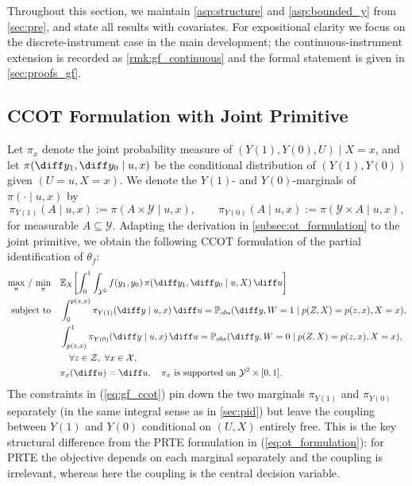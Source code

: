 Throughout this section, we maintain \cref{asp:structure} and \cref{asp:bounded_y} from \cref{sec:pre}, and state all results with covariates. For expositional clarity we focus on the discrete-instrument case in the main development; the continuous-instrument extension is recorded as \cref{rmk:gf_continuous} and the formal statement is given in \cref{sec:proofs_gf}.

\subsection{CCOT Formulation with Joint Primitive}\label{subsec:gf_setup}

Let $\pi_x$ denote the joint probability measure of $(Y(1), Y(0), U) \mid X = x$, and let $\pi(\diff y_1, \diff y_0 \mid u, x)$ be the conditional distribution of $(Y(1), Y(0))$ given $(U = u, X = x)$. We denote the $Y(1)$- and $Y(0)$-marginals of $\pi(\cdot \mid u, x)$ by
\begin{equation}\label{eq:gf_marginals}
    \pi_{Y(1)}(A \mid u, x) := \pi(A \times \mathcal{Y} \mid u, x),\qquad
    \pi_{Y(0)}(A \mid u, x) := \pi(\mathcal{Y} \times A \mid u, x),
\end{equation}
for measurable $A \subseteq \mathcal{Y}$. Adapting the derivation in \cref{subsec:ot_formulation} to the joint primitive, we obtain the following CCOT formulation of the partial identification of $\theta_f$:
\begin{equation}\label{eq:gf_ccot}
    \begin{split}
        \max_{\pi}\, /\, \min_{\pi} \quad & \mathbb{E}_X\!\left[\int_0^1 \int_{\mathcal{Y}^2} f(y_1, y_0)\, \pi(\diff y_1, \diff y_0 \mid u, X)\, \diff u\right] \\
        \text{subject to} \quad & \int_0^{p(z,x)} \pi_{Y(1)}(\diff y \mid u, x)\, \diff u = \mathbb{P}_{obs}(\diff y, W=1 \mid p(Z,X) = p(z,x), X = x), \\
        & \int_{p(z,x)}^1 \pi_{Y(0)}(\diff y \mid u, x)\, \diff u = \mathbb{P}_{obs}(\diff y, W=0 \mid p(Z,X) = p(z,x), X = x),\\
        & \quad \forall z \in \mathcal{Z},\ \forall x \in \mathcal{X},\\
        & \pi_x(\diff u) = \diff u,\quad \pi_x \text{ is supported on } \mathcal{Y}^2 \times [0,1].
    \end{split}
\end{equation}
The constraints in (\ref{eq:gf_ccot}) pin down the two marginals $\pi_{Y(1)}$ and $\pi_{Y(0)}$ separately (in the same integral sense as in \cref{sec:pid}) but leave the coupling between $Y(1)$ and $Y(0)$ conditional on $(U, X)$ entirely free. This is the key structural difference from the PRTE formulation in (\ref{eq:ot_formulation}): for PRTE the objective depends on each marginal separately and the coupling is irrelevant, whereas here the coupling is the central decision variable.

